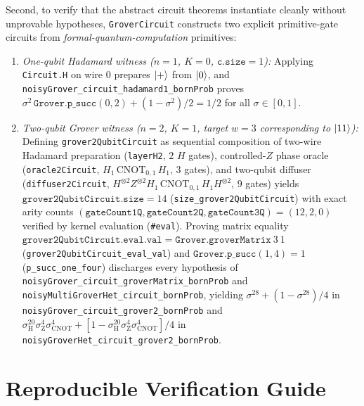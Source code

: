 {\setlength{\emergencystretch}{5em}%
Second, to verify that the abstract circuit theorems instantiate cleanly without unprovable hypotheses, \texttt{GroverCircuit} constructs two explicit primitive-gate circuits from \emph{formal-quantum-computation} primitives:
\begin{enumerate}\setlength{\emergencystretch}{5em}
\item \emph{One-qubit Hadamard witness ($n = 1$, $K = 0$, $\texttt{c.size} = 1$):} Applying \texttt{Circuit.H} on wire $0$ prepares $\ket{+}$ from $\ket{0}$, and \texttt{noisyGrover\_circuit\_hadamard1\_bornProb} proves $\sigma^2\,\texttt{Grover.p\_succ}(0, 2) + (1 - \sigma^2)/2 = 1/2$ for all $\sigma \in [0, 1]$.
\item \emph{Two-qubit Grover witness ($n = 2$, $K = 1$, target $w = 3$ corresponding to $\ket{11}$):} Defining \texttt{grover2QubitCircuit} as sequential composition of two-wire Hadamard preparation (\texttt{layerH2}, $2$ $H$ gates), controlled-$Z$ phase oracle (\texttt{oracle2Circuit}, $H_1\,\mathrm{CNOT}_{0,1}\,H_1$, $3$ gates), and two-qubit diffuser (\texttt{diffuser2Circuit}, $H^{\otimes 2} Z^{\otimes 2} H_1\,\mathrm{CNOT}_{0,1}\,H_1 H^{\otimes 2}$, $9$ gates) yields $\texttt{grover2QubitCircuit.size} = 14$ (\texttt{size\_grover2QubitCircuit}) with exact arity counts $(\texttt{gateCount1Q}, \texttt{gateCount2Q}, \texttt{gateCount3Q}) = (12, 2, 0)$ verified by kernel evaluation (\texttt{\#eval}). Proving matrix equality $\texttt{grover2QubitCircuit.eval.val} = \texttt{Grover.groverMatrix}\ 3\ 1$ (\texttt{grover2QubitCircuit\_eval\_val}) and $\texttt{Grover.p\_succ}(1, 4) = 1$ (\texttt{p\_succ\_one\_four}) discharges every hypothesis of \texttt{noisyGrover\_circuit\_groverMatrix\_bornProb} and \texttt{noisyMultiGroverHet\_circuit\_bornProb}, yielding $\sigma^{28} + (1 - \sigma^{28})/4$ in \texttt{noisyGrover\_circuit\_grover2\_bornProb} and $\sigma_{\mathrm{H}}^{20}\sigma_{\mathrm{Z}}^4\sigma_{\mathrm{CNOT}}^4 + [1 - \sigma_{\mathrm{H}}^{20}\sigma_{\mathrm{Z}}^4\sigma_{\mathrm{CNOT}}^4]/4$ in \texttt{noisyGroverHet\_circuit\_grover2\_bornProb}.
\end{enumerate}\par}

\section{Reproducible Verification Guide}
\label{sec:supp-reproducibility}

